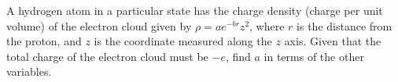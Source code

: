 A hydrogen atom in a particular state has the charge density (charge per unit volume)
of the electron cloud given by $\rho=ae^{-br}z^2$, where $r$ is the distance from the
proton, and $z$ is the coordinate measured along the $z$ axis. Given that the total
charge of the electron cloud must be $-e$, find $a$ in terms of the other variables.
